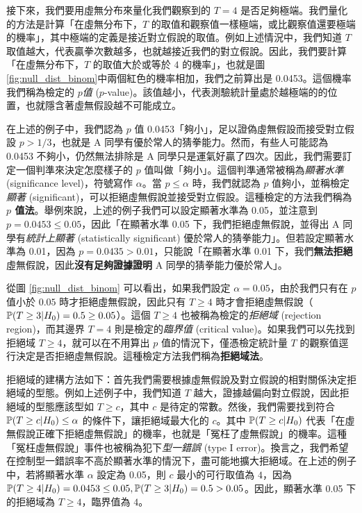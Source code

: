     接下來，我們要用虛無分布來量化我們觀察到的 $T=4$ 是否足夠極端。我們量化的方法是計算「在虛無分布下，$T$ 的取值和觀察值一樣極端，或比觀察值還要極端的機率」，其中極端的定義是接近對立假說的取值。例如上述情況中，我們知道 $T$ 取值越大，代表贏拳次數越多，也就越接近我們的對立假說。因此，我們要計算「在虛無分布下，$T$ 的取值大於或等於 $4$ 的機率」，也就是圖 \ref{fig:null_dist_binom}中兩個紅色的機率相加，我們之前算出是 0.0453。這個機率我們稱為檢定的 $p$\textit{值} ($p$-value)。該值越小，代表測驗統計量處於越極端的的位置，也就隱含著虛無假設越不可能成立。

    在上述的例子中，我們認為 $p$ 值 0.0453「夠小」，足以證偽虛無假設而接受對立假設 $p > 1/3$，也就是 A 同學有優於常人的猜拳能力。然而，有些人可能認為 0.0453 不夠小，仍然無法排除是 A 同學只是運氣好贏了四次。因此，我們需要訂定一個判準來決定怎麼樣子的 $p$ 值叫做「夠小」。這個判準通常被稱為\textit{顯著水準} (significance level)，符號寫作 $\alpha$。當 $p \le \alpha$ 時，我們就認為 $p$ 值夠小，並稱檢定\textit{顯著} (significant)，可以拒絕虛無假說並接受對立假設。這種檢定的方法我們稱為 \textbf{$p$ 值法}。舉例來說，上述的例子我們可以設定顯著水準為 0.05，並注意到 $p = 0.0453 \le 0.05$，因此「在顯著水準 0.05 下，我們拒絕虛無假說，並得出 A 同學有\textit{統計上顯著} (statistically significant) 優於常人的猜拳能力」。但若設定顯著水準為 0.01，因為 $p = 0.0435 > 0.01$，只能說「在顯著水準 0.01 下，我們\textbf{無法拒絕}虛無假說，因此\textbf{沒有足夠證據證明} A 同學的猜拳能力優於常人」。

    從圖 \ref{fig:null_dist_binom} 可以看出，如果我們設定 $\alpha = 0.05$，由於我們只有在 $p$ 值小於 $0.05$ 時才拒絕虛無假說，因此只有 $T \ge 4$ 時才會拒絕虛無假說（$\mathbb{P}(T \ge 3 | H_0) = 0.5 \ge 0.05$）。這個 $T \ge 4$ 也被稱為檢定的\textit{拒絕域} (rejection region)，而其邊界 $T=4$ 則是檢定的\textit{臨界值} (critical value)。如果我們可以先找到拒絕域 $T \ge 4$，就可以在不用算出 $p$ 值的情況下，僅憑檢定統計量 $T$ 的觀察值逕行決定是否拒絕虛無假說。這種檢定方法我們稱為\textbf{拒絕域法}。
    
    拒絕域的建構方法如下：首先我們需要根據虛無假說及對立假說的相對關係決定拒絕域的型態。例如上述例子中，我們知道 $T$ 越大，證據越偏向對立假說，因此拒絕域的型態應該型如 $T \ge c$，其中 $c$ 是待定的常數。然後，我們需要找到符合 $\mathbb{P}(T \ge c | H_0) \le \alpha$ 的條件下，讓拒絕域最大化的 $c$。其中 $\mathbb{P}(T \ge c | H_0)$ 代表「在虛無假說正確下拒絕虛無假說」的機率，也就是「冤枉了虛無假說」的機率。這種「冤枉虛無假說」事件也被稱為犯下\textit{型一錯誤} (type I error)。換言之，我們希望在控制型一錯誤率不高於顯著水準的情況下，盡可能地擴大拒絕域。在上述的例子中，若將顯著水準 $\alpha$ 設定為 0.05，則 $c$ 最小的可行取值為 $4$，因為 $\mathbb{P}(T \ge 4 | H_0) = 0.0453 \le 0.05, \mathbb{P}(T \ge 3 | H_0) = 0.5 > 0.05$。因此，顯著水準 0.05 下的拒絕域為 $T \ge 4$，臨界值為 $4$。

